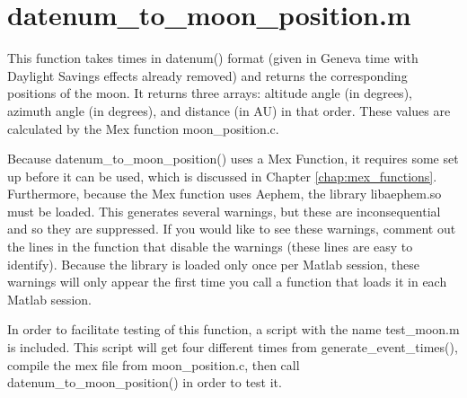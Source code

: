 \documentclass[12pt]{report}
\begin{document}
\section{datenum\_to\_moon\_position.m}
This function takes times in datenum() format (given in Geneva time with Daylight Savings effects already removed) and returns the corresponding positions of the moon.  It returns three arrays: altitude angle (in degrees), azimuth angle (in degrees), and distance (in AU) in that order.  These values are calculated by the Mex function moon\_position.c.  

Because datenum\_to\_moon\_position() uses a Mex Function, it requires some set up before it can be used, which is discussed in Chapter \ref{chap:mex_functions}.  Furthermore, because the Mex function uses Aephem, the library libaephem.so must be loaded.  This generates several warnings, but these are inconsequential and so they are suppressed.  If you would like to see these warnings, comment out the lines in the function that disable the warnings (these lines are easy to identify).  Because the library is loaded only once per Matlab session, these warnings will only appear the first time you call a function that loads it in each Matlab session.

In order to facilitate testing of this function, a script with the name test\_moon.m is included.  This script will get four different times from generate\_event\_times(), compile the mex file from moon\_position.c, then call datenum\_to\_moon\_position() in order to test it.
\end{document}
